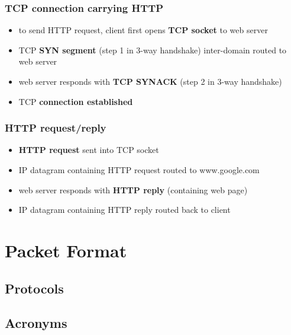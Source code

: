 \documentclass[12pt, a4paper]{article}
\begin{document}
\begin{multicols*}{2}
	\subsubsection{TCP connection carrying HTTP}
	\begin{itemize}
		\item to send HTTP request, client first opens \textbf{TCP socket} to web server
		\item TCP \textbf{SYN segment} (step 1 in 3-way handshake) inter-domain routed to web server
		\item web server responds with \textbf{TCP SYNACK} (step 2 in 3-way handshake)
		\item TCP \textbf{connection established}
	\end{itemize}
	\subsubsection{HTTP request/reply}
	\begin{itemize}
		\item \textbf{HTTP request} sent into TCP socket
		\item IP datagram containing HTTP request routed to www.google.com
		\item web server responds with \textbf{HTTP reply} (containing web page)
		\item IP datagram containing HTTP reply routed back to client
	\end{itemize}
	
\end{multicols*}	
	
	\newpage
	\section{Packet Format}
	
	
	\newpage
	\begin{multicols*}{2}
		\section{Protocols}
		
	\end{multicols*}
	
	\newpage
	\begin{multicols*}{2}
	\section{Acronyms}
	


\end{multicols*}	
\end{document}
